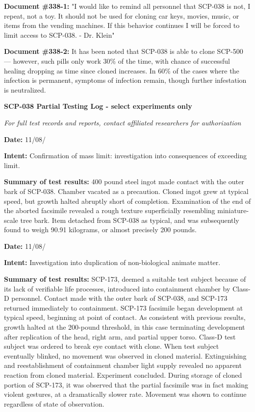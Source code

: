 \textbf{Document \#338-1:} "I would like to remind all personnel that SCP-038 is not, I repeat, not a toy. It should not be used for cloning car keys, movies, music, or items from the vending machines. If this behavior continues I will be forced to limit access to SCP-038.
- Dr. Klein"

\textbf{Document \#338-2:} It has been noted that SCP-038 is able to clone SCP-500 — however, such pills only work 30\% of the time, with chance of successful healing dropping as time since cloned increases. In 60\% of the cases where the infection is permanent, symptoms of infection remain, though further infestation is neutralized.

\textbf{SCP-038 Partial Testing Log - select experiments only}

\textsl{For full test records and reports, contact affiliated researchers for authorization}

\textbf{Date:} 11/08/

\textbf{Intent:} Confirmation of mass limit: investigation into consequences of exceeding limit.

\textbf{Summary of test results:} 400 pound steel ingot made contact with the outer bark of SCP-038. Chamber vacated as a precaution. Cloned ingot grew at typical speed, but growth halted abruptly short of completion. Examination of the end of the aborted facsimile revealed a rough texture superficially resembling miniature-scale tree bark. Item detached from SCP-038 as typical, and was subsequently found to weigh 90.91 kilograms, or almost precisely 200 pounds.

\textbf{Date:} 11/08/

\textbf{Intent:} Investigation into duplication of non-biological animate matter.

\textbf{Summary of test results:} SCP-173, deemed a suitable test subject because of its lack of verifiable life processes, introduced into containment chamber by Class-D personnel. Contact made with the outer bark of SCP-038, and SCP-173 returned immediately to containment. SCP-173 facsimile began development at typical speed, beginning at point of contact. As consistent with previous results, growth halted at the 200-pound threshold, in this case terminating development after replication of the head, right arm, and partial upper torso. Class-D test subject was ordered to break eye contact with clone. When test subject eventually blinked, no movement was observed in cloned material. Extinguishing and reestablishment of containment chamber light supply revealed no apparent reaction from cloned material. Experiment concluded. During storage of cloned portion of SCP-173, it was observed that the partial facsimile was in fact making violent gestures, at a dramatically slower rate. Movement was shown to continue regardless of state of observation.